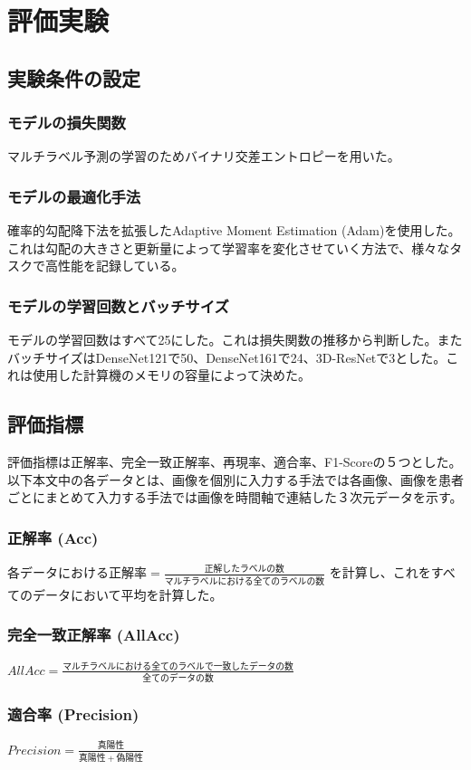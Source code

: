 \section{評価実験}
\subsection{実験条件の設定}
\subsubsection{モデルの損失関数}
マルチラベル予測の学習のためバイナリ交差エントロピーを用いた。
\subsubsection{モデルの最適化手法}
確率的勾配降下法\cite{SGD}を拡張したAdaptive Moment Estimation (Adam)\cite{Adam}を使用した。これは勾配の大きさと更新量によって学習率を変化させていく方法で、様々なタスクで高性能を記録している。
\subsubsection{モデルの学習回数とバッチサイズ}
モデルの学習回数はすべて25にした。これは損失関数の推移から判断した。またバッチサイズはDenseNet121で50、DenseNet161で24、3D-ResNetで3とした。これは使用した計算機のメモリの容量によって決めた。
\subsection{評価指標}
評価指標は正解率、完全一致正解率、再現率、適合率、F1-Scoreの５つとした。
以下本文中の各データとは、画像を個別に入力する手法では各画像、画像を患者ごとにまとめて入力する手法では画像を時間軸で連結した３次元データを示す。
\subsubsection{正解率 (Acc)}
$各データにおける正解率 = \frac{正解したラベルの数}{マルチラベルにおける全てのラベルの数}$
を計算し、これをすべてのデータにおいて平均を計算した。
\subsubsection{完全一致正解率 (AllAcc)}
$AllAcc=\frac{マルチラベルにおける全てのラベルで一致したデータの数}{全てのデータの数}$
\subsubsection{適合率 (Precision)}
$Precision = \frac{真陽性}{真陽性+偽陽性}$

